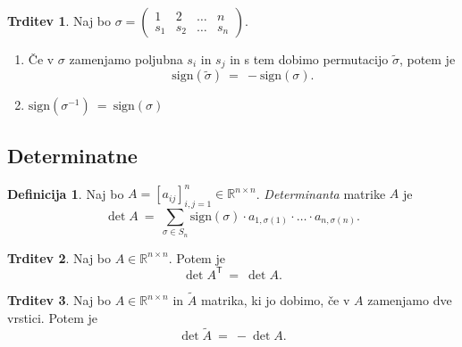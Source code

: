 \documentclass[11pt]{article}
\newcommand{\R}{\mathbb{R}}
\newcommand{\0}{\mathbf{0}}
\newcommand{\sgn}{\text{sign}}
\newcommand{\T}{\mathsf{T}}
\theoremstyle{definition}
\newtheorem{definicija}{Definicija}[section]
\theoremstyle{definition}
\newtheorem{trditev}{Trditev}[section]
\theoremstyle{definition}
\theoremstyle{definition}
\begin{document}
\begin{trditev}

Naj bo $\sigma = \begin{pmatrix}
1 & 2 & \ldots & n \\
s_1 & s_2 & \ldots & s_n
\end{pmatrix}$.

\begin{enumerate}

\item Če v $\sigma$ zamenjamo poljubna $s_i$ in $s_j$ in s tem dobimo permutacijo $\tilde{\sigma}$, potem je
$$\sgn(\tilde{\sigma}) ~=~ -\sgn(\sigma).$$

\item $\sgn(\sigma^{-1}) ~=~ \sgn(\sigma)$

\end{enumerate}

\end{trditev}
\vspace{0.5cm}


\subsection{Determinatne}
\vspace{0.5cm}

\begin{definicija}

Naj bo $A = [a_{ij}]_{i,j=1}^n \in \R^{n \times n}$. \textit{Determinanta} matrike $A$ je
$$\det A ~=~ \sum_{\sigma \in S_n} \sgn(\sigma) \cdot a_{1,\sigma(1)} \cdot \ldots \cdot a_{n,\sigma(n)}.$$

\end{definicija}
\vspace{0.5cm}

\begin{trditev}

Naj bo $A \in \R^{n \times n}$. Potem je 
$$\det A^\T ~=~ \det A.$$

\end{trditev}
\vspace{0.5cm}

\begin{trditev}

Naj bo $A \in \R^{n \times n}$ in $\tilde{A}$ matrika, ki jo dobimo, če v $A$ zamenjamo dve vrstici. Potem je
$$\det \tilde{A} ~=~ -\det A.$$

\end{trditev}
\vspace{0.5cm}
\end{document}
